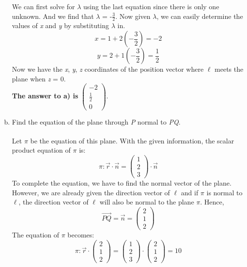 \documentclass{article}
\begin{document}
\begin{enumerate}[a)]
\begin{enumerate}[ ]
\end{enumerate}
We can first solve for \(\lambda\) using the last equation since there is only one unknown. And we find that \(\lambda\) = -\(\frac{3}{2}\). Now given \(\lambda\), we can easily determine the values of \textit{x} and \textit{y} by substituting \(\lambda\) in. 
$$\textit{x} = 1 + 2(-\frac{3}{2}) = -2$$
 $$\textit{y} = 2 + 1(-\frac{3}{2}) = \frac{1}{2}$$
 Now we have the \textit{x}, \textit{y}, \textit{z} coordinates of the position vector where \(\ell\) meets the plane when \textit{z} = 0. \\\textbf{The answer to a) is }\(\begin{pmatrix}-2 \\ \frac{1}{2} \\ 0 \end{pmatrix}\). \\
\item  Find the equation of the plane through \textit{P} normal to \textit{PQ}. 
\\ \\
Let \(\pi\) be the equation of this plane. With the given information, the scalar product equation of \(\pi\) is:
$$\pi : \vec{r} \cdot \vec{n} = \begin{pmatrix}1 \\ 2 \\ 3 \end{pmatrix} \cdot \vec{n}$$
To complete the equation, we have to find the normal vector of the plane. However, we are already given the direction vector of \(\ell\) and if \(\pi\) is normal to \(\ell\), the direction vector of \(\ell\) will also be normal to the plane \(\pi\). Hence,
$$\overrightarrow{PQ} = \vec{n} = \begin{pmatrix}2 \\ 1  \\ 2  \end{pmatrix}$$The equation of \(\pi\) becomes:
$$\pi : \vec{r} \cdot \begin{pmatrix}2 \\ 1  \\ 2  \end{pmatrix} = \begin{pmatrix}1 \\ 2  \\ 3  \end{pmatrix} \cdot \begin{pmatrix}2 \\ 1  \\ 2  \end{pmatrix} = 10$$


\end{enumerate}
\end{document}
